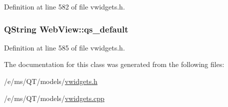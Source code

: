 Definition at line 582 of file vwidgets.h.

\hypertarget{classWebView_a55dccc8c2c7b617ff63132d1a1f8df11}{
\subsubsection[{qs\_\-default}]{\setlength{\rightskip}{0pt plus 5cm}QString {\bf WebView::qs\_\-default}}}
\label{classWebView_a55dccc8c2c7b617ff63132d1a1f8df11}


Definition at line 585 of file vwidgets.h.



The documentation for this class was generated from the following files:\begin{DoxyCompactItemize}
\item 
/e/ms/QT/models/\hyperlink{vwidgets_8h}{vwidgets.h}\item 
/e/ms/QT/models/\hyperlink{vwidgets_8cpp}{vwidgets.cpp}\end{DoxyCompactItemize}
